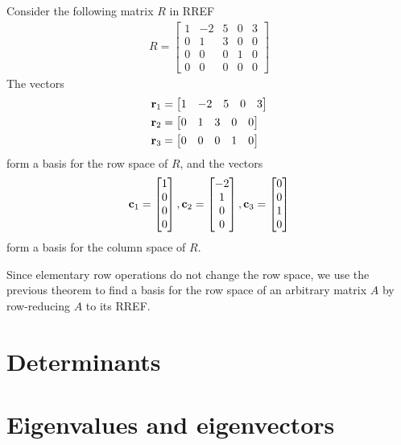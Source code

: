 \documentclass[12pt,letterpaper,reqno]{article}
\numberwithin{equation}{section}
\newcommand{\fixme}[1]{{\color{orange}{[#1]}}}
\begin{document}
\begin{pf}
\fixme{Add proof.}	
\end{pf}


\begin{example}
Consider the following matrix $R$ in RREF
\begin{align*}
	R=\begin{bmatrix}
		1&-2&5&0&3\\0&1&3&0&0\\
		0&0&0&1&0\\0&0&0&0&0
	\end{bmatrix}
\end{align*}	
The vectors 
\begin{align*}
	{\bf r}_1&=\begin{bmatrix}
		1&-2&5&0&3
	\end{bmatrix} \\
	{\bf r}_2&=\begin{bmatrix}
		0&1&3&0&0
	\end{bmatrix} \\
	{\bf r}_3&=\begin{bmatrix}
		0&0&0&1&0
	\end{bmatrix} \\	
\end{align*}
form a basis for the row space of $R$, and the vectors 
\begin{align*}
	{\bf c}_1=\begin{bmatrix}
		1\\0\\0\\0
	\end{bmatrix}, {\bf c}_2=\begin{bmatrix}
		-2\\1\\0\\0
	\end{bmatrix}, {\bf c}_3=\begin{bmatrix}
		0\\0\\1\\0
	\end{bmatrix}
\end{align*}
form a basis for the column space of $R$.
\end{example}

Since elementary row operations do not change the row space, we use the previous theorem to find a basis for the row space of an arbitrary matrix $A$ by row-reducing $A$ to its RREF.
	
\section{Determinants}

\section{Eigenvalues and eigenvectors}

\printbibliography
\end{document}
